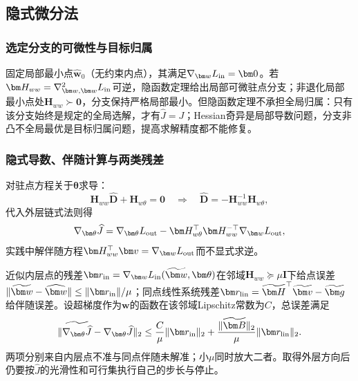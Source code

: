 \subsection{隐式微分法}

\subsubsection{选定分支的可微性与目标归属}

固定局部最小点$\widehat{\bm w}_0$（无约束内点），其满足$\nabla_{\bm w}L_{\rm in}=\bm0$。若$\bm H_{ww}=\nabla_{\bm w,\bm w}^2L_{\rm in}$可逆，隐函数定理给出局部可微驻点分支；非退化局部最小点处$\bm H_{ww}\succ\bm0$，分支保持严格局部最小。但隐函数定理不承担全局归属：只有该分支始终是规定的全局选解，才有$\widehat J=J$；Hessian奇异是局部导数问题，分支非凸不全局最优是目标归属问题，提高求解精度都不能修复。

\subsubsection{隐式导数、伴随计算与两类残差}

对驻点方程关于$\bm\theta$求导：
\[
 \bm H_{ww}\widehat{\bm D}+\bm H_{w\theta}=\bm0
 \quad\Longrightarrow\quad
 \widehat{\bm D}=-\bm H_{ww}^{-1}\bm H_{w\theta},
\]
代入外层链式法则得
\begin{equation}
 \nabla_{\bm\theta}\widehat J
 =\nabla_{\bm\theta}L_{\rm out}
 -\bm H_{w\theta}^\top\bm H_{ww}^{-\top}\nabla_{\bm w}L_{\rm out},
 \label{eq:opt-implicit-hypergradient}
\end{equation}
实践中解伴随方程$\bm H_{ww}^\top\bm v=\nabla_{\bm w}L_{\rm out}$而不显式求逆。

近似内层点的残差$\bm r_{\rm in}=\nabla_{\bm w}L_{\rm in}(\widetilde{\bm w},\bm\theta)$在邻域$\bm H_{ww}\succeq\mu\bm I$下给点误差$\|\widetilde{\bm w}-\widehat{\bm w}\|\leq\|\bm r_{\rm in}\|/\mu$；同点线性系统残差$\bm r_{\rm lin}=\widetilde{\bm H}^\top\widetilde{\bm v}-\widetilde{\bm g}$给伴随误差。设超梯度作为$\bm w$的函数在该邻域Lipschitz常数为$C$，总误差满足
\begin{equation}
 \|\widetilde{\nabla_{\bm\theta}\widehat J}
 -\nabla_{\bm\theta}\widehat J\|_2
 \leq\frac{C}{\mu}\|\bm r_{\rm in}\|_2
 +\frac{\|\widetilde{\bm B}\|_2}{\mu}\|\bm r_{\rm lin}\|_2.
 \label{eq:opt-hypergradient-two-residuals}
\end{equation}
两项分别来自内层点不准与同点伴随未解准；小$\mu$同时放大二者。取得外层方向后仍要按$\widehat J$的光滑性和可行集执行自己的步长与停止。

